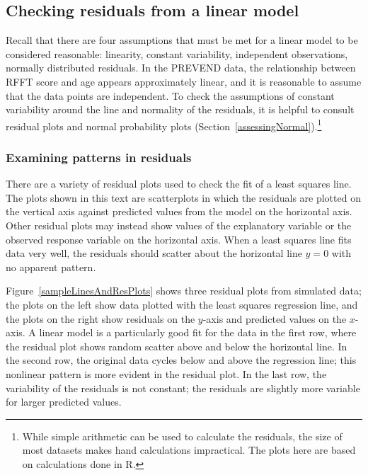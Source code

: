 \subsection{Checking residuals from a linear model}
\label{checkingResiduals}


Recall that there are four assumptions that must be met for a linear model to be considered reasonable: linearity, constant variability, independent observations, normally distributed residuals. In the PREVEND data, the relationship between RFFT score and age appears approximately linear, and it is reasonable to assume that the data points are independent. To check the assumptions of constant variability around the line and normality of the residuals, it is helpful to consult residual plots and normal probability plots (Section~\ref{assessingNormal}).\footnote{While simple arithmetic can be used to calculate the residuals, the size of most datasets makes hand calculations impractical. The plots here are based on calculations done in \textsf{R}.}


\textD{\newpage}


\subsubsection{Examining patterns in residuals}

There are a variety of residual plots used to check the fit of a least squares line. The plots shown in this text are scatterplots in which the residuals are plotted on the vertical axis against predicted values from the model on the horizontal axis. Other residual plots may instead show values of the explanatory variable or the observed response variable on the horizontal axis. When a least squares line fits data very well, the residuals should scatter about the horizontal line $y = 0$ with no apparent pattern.

Figure~\ref{sampleLinesAndResPlots} shows three residual plots from simulated data; the plots on the left show data plotted with the least squares regression line, and the plots on the right show residuals on the $y$-axis and predicted values on the $x$-axis. A linear model is a particularly good fit for the data in the first row, where the residual plot shows random scatter above and below the horizontal line. In the second row, the original data cycles below and above the regression line; this nonlinear pattern is more evident in the residual plot. In the last row, the variability of the residuals is not constant; the residuals are slightly more variable for larger predicted values.


